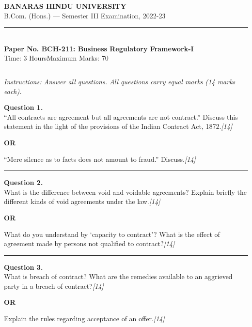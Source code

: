 \documentclass[11pt,a4paper]{article}
\newcommand{\pts}[1]{\hfill   \textit{[#1]}}
\begin{document}
\begin{center}
  {\large\bfseries BANARAS HINDU UNIVERSITY}\\[2pt]
  {\normalsize B.Com. (Hons.) --- Semester III Examination, 2022-23}\\[6pt]
  \rule{0.8\linewidth}{0.5pt}\\[6pt]
  {\large\bfseries Paper No. BCH-211: Business Regulatory Framework-I}\\[4pt]
  {\normalsize Time: 3 Hours\hfill Maximum Marks: 70}
\end{center}

\rule{\linewidth}{0.4pt}

\smallskip



\noindent   \textit{Instructions: Answer all questions. All questions carry equal marks (14 marks each).}

\bigskip




\noindent   \textbf{Question 1.} \\
``All contracts are agreement but all agreements are not contract.'' Discuss this statement in the light of the provisions of the Indian Contract Act, 1872.\pts{14}

\centerline{   \textbf{OR}}

``Mere silence as to facts does not amount to fraud.'' Discuss.\pts{14}

\medskip\rule{\linewidth}{0.2pt}




\noindent   \textbf{Question 2.} \\
What is the difference between void and voidable agreements? Explain briefly the different kinds of void agreements under the law.\pts{14}

\centerline{   \textbf{OR}}

What do you understand by `capacity to contract'? What is the effect of agreement made by persons not qualified to contract?\pts{14}

\medskip\rule{\linewidth}{0.2pt}




\noindent   \textbf{Question 3.} \\
What is breach of contract? What are the remedies available to an aggrieved party in a breach of contract?\pts{14}

\centerline{   \textbf{OR}}

Explain the rules regarding acceptance of an offer.\pts{14}
\end{document}
